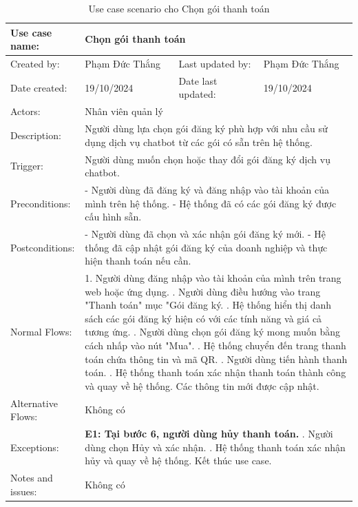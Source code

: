 \begin{table}[H]
\centering
\begin{tabular}{|l|l|l|l|}
\hline
Use case name: & \multicolumn{3}{|l|}{Chọn gói thanh toán} \\
\hline
Created by: & Phạm Đức Thắng & Last updated by: & Phạm Đức Thắng \\
\hline
Date created: & 19/10/2024 & Date last updated: & 19/10/2024 \\
\hline
Actors: & \multicolumn{3}{|l|}{Nhân viên quản lý} \\
\hline
Description: & \multicolumn{3}{|p{12cm}|}{Người dùng lựa chọn gói đăng ký phù hợp với nhu cầu sử dụng dịch vụ chatbot từ các gói có sẵn trên hệ thống.} \\
\hline
Trigger: & \multicolumn{3}{|p{12cm}|}{Người dùng muốn chọn hoặc thay đổi gói đăng ký dịch vụ chatbot.} \\
\hline
Preconditions: & \multicolumn{3}{|p{12cm}|}{
- Người dùng đã đăng ký và đăng nhập vào tài khoản của mình trên hệ thống. \newline
- Hệ thống đã có các gói đăng ký được cấu hình sẵn.
} \\
\hline
Postconditions: & \multicolumn{3}{|p{12cm}|}{
- Người dùng đã chọn và xác nhận gói đăng ký mới. \newline
- Hệ thống đã cập nhật gói đăng ký của doanh nghiệp và thực hiện thanh toán nếu cần.
} \\
\hline
Normal Flows: & \multicolumn{3}{|p{12cm}|}{
1. Người dùng đăng nhập vào tài khoản của mình trên trang web hoặc ứng dụng. \newline
2. Người dùng điều hướng vào trang "Thanh toán" mục "Gói đăng ký. \newline
3. Hệ thống hiển thị danh sách các gói đăng ký hiện có với các tính năng và giá cả tương ứng. \newline
4. Người dùng chọn gói đăng ký mong muốn bằng cách nhấp vào nút "Mua". \newline
5. Hệ thống chuyển đến trang thanh toán chứa thông tin và mã QR. \newline
6. Người dùng tiến hành thanh toán. \newline
7. Hệ thống thanh toán xác nhận thanh toán thành công và quay về hệ thống. Các thông tin mới được cập nhật.
}\\
\hline
Alternative Flows: & \multicolumn{3}{|p{12cm}|}{Không có} \\
\hline
Exceptions: & \multicolumn{3}{|p{12cm}|}{
\textbf{E1: Tại bước 6, người dùng hủy thanh toán.} \newline
6.1. Người dùng chọn Hủy và xác nhận. \newline
6.2. Hệ thống thanh toán xác nhận hủy và quay về hệ thống. \newline
Kết thúc use case.
} \\
\hline
Notes and issues: & \multicolumn{3}{|p{12cm}|}{Không có} \\
\hline
\end{tabular}
\caption{Use case scenario cho Chọn gói thanh toán}
\end{table}


